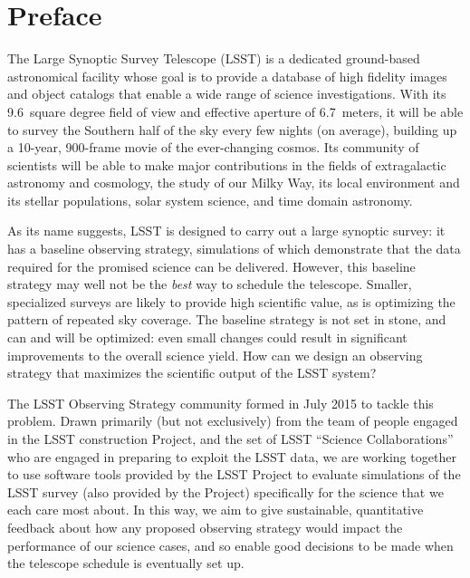 \setcounter{chapter}{0}
\chapter*{Preface}
\def\chpname{preface}\label{chp:\chpname}
\markboth{}{}

\noindent The Large Synoptic Survey Telescope (LSST) is a dedicated
ground-based astronomical facility whose goal is to provide a database
of high fidelity images and object catalogs that enable a wide range of
science investigations. With its 9.6~square degree field of view and
effective aperture of 6.7~meters, it will be able to survey the Southern half of the sky every few nights (on average), building up a 10-year, 900-frame movie of the ever-changing cosmos. Its community of scientists will be able to make major contributions in the fields of extragalactic astronomy and cosmology, the study of our Milky Way, its local environment and its stellar populations, solar system science, and time domain astronomy.

\noindent As its name suggests, LSST is designed to
carry out a large synoptic survey: it has a baseline observing strategy, simulations of which demonstrate that the data required for
the promised science can be delivered.
However, this baseline strategy may well not be the {\it
best} way to schedule the telescope. Smaller, specialized surveys are
likely to provide high scientific value, as is optimizing the pattern of
repeated sky coverage.  The baseline strategy is not set in
stone, and can and will be optimized: even small changes could result in
significant improvements to the overall science yield. How can we design
an observing strategy that maximizes the scientific output of the LSST
system?

\noindent The LSST Observing Strategy community formed in July 2015 to
tackle this problem. Drawn primarily (but not exclusively) from the team of people engaged in the LSST construction Project, and the set of LSST ``Science Collaborations'' who are engaged in preparing to exploit the LSST data, we are working together
to use software tools provided by the LSST Project
to evaluate simulations of the LSST survey (also provided by the
Project) specifically for the science that we each care most about. In
this way, we aim to give sustainable, quantitative feedback about how any
proposed observing strategy would impact the performance of our science
cases, and so enable good decisions to be made when the telescope
schedule is eventually set up.

